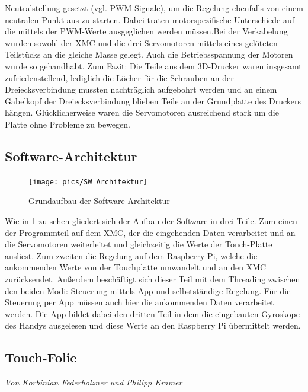 \documentclass[12pt,a4paper,bibliography=totoc,listof=totoc]{scrartcl}
\begin{document}
Neutralstellung gesetzt (vgl. PWM-Signale), um die Regelung ebenfalls von einem neutralen Punkt aus zu 
starten. Dabei traten motorspezifische Unterschiede auf die mittels der PWM-Werte ausgeglichen werden 
müssen.Bei der Verkabelung wurden sowohl der XMC und die drei Servomotoren mittels eines gelöteten 
Teilstücks an die gleiche Masse gelegt. Auch die Betriebsspannung der Motoren wurde so gehandhabt.
Zum Fazit:
Die Teile aus dem 3D-Drucker waren insgesamt zufriedenstellend, lediglich die Löcher für die Schrauben 
an der Dreiecksverbindung mussten nachträglich aufgebohrt werden und an einem Gabelkopf der 
Dreiecksverbindung blieben Teile an der Grundplatte des Druckers hängen. Glücklicherweise waren die 
Servomotoren ausreichend stark um die Platte ohne Probleme zu bewegen.

\subsection{Software-Architektur}
\begin{figure}[htbp]
	\centering
	\texttt{[image: pics/SW Architektur]}
	\caption{Grundaufbau der Software-Architektur}
	\label{fig:SWarchitektur}
\end{figure}

Wie in \ref{fig:SWarchitektur} zu sehen gliedert sich der Aufbau der Software in drei Teile. Zum einen der 
Programmteil auf dem XMC, der die eingehenden Daten verarbeitet und an die Servomotoren weiterleitet und 
gleichzeitig die Werte der Touch-Platte ausliest. Zum zweiten die Regelung auf dem Raspberry Pi, welche 
die ankommenden Werte von der Touchplatte umwandelt und an den XMC zurücksendet. Außerdem beschäftigt sich 
dieser Teil mit dem Threading zwischen den beiden Modi: Steuerung mittels App und selbstständige Regelung. 
Für die Steuerung per App müssen auch hier die ankommenden Daten verarbeitet werden. Die App bildet dabei 
den dritten Teil in dem die eingebauten Gyroskope des Handys ausgelesen und diese Werte an den Raspberry Pi 
übermittelt werden.
\subsection{Touch-Folie} \label{subsec:Touch-Folie}
\textit{Von Korbinian Federholzner und Philipp Kramer}\newline
\end{document}
